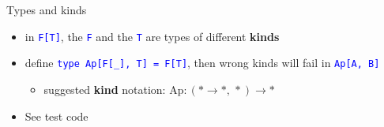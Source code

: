 \documentclass[english]{beamer}
\begin{document}
\begin{frame}{Types and kinds}
\begin{itemize}
\begin{itemize}
\item in \texttt{\textcolor{blue}{\footnotesize{}F{[}T{]}}}, the \texttt{\textcolor{blue}{\footnotesize{}F}}
and the \texttt{\textcolor{blue}{\footnotesize{}T}} are types of different
\textbf{kinds}
\item define \texttt{\textcolor{blue}{\footnotesize{}type Ap{[}F{[}\_{]},
T{]} = F{[}T{]}}}, then wrong kinds will fail in \texttt{\textcolor{blue}{\footnotesize{}Ap{[}A,
B{]}}}{\footnotesize \par}
\begin{itemize}
\item suggested \textbf{kind} notation:{\footnotesize{} $\text{Ap}:(*\rightarrow*,\,*)\rightarrow*$}{\footnotesize \par}
\end{itemize}
\item See test code
\end{itemize}
\end{itemize}
\end{frame}
\end{document}

